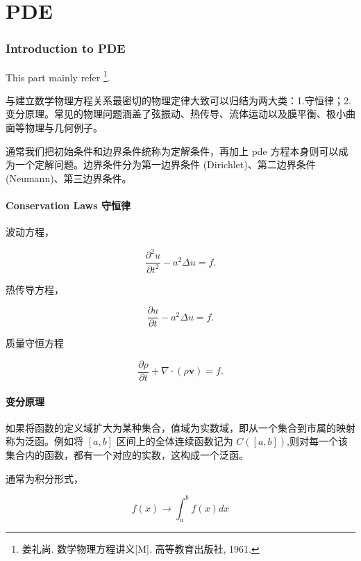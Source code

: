 \part{PDE}
\section{Introduction to PDE}

This part mainly refer \footnote{姜礼尚. 数学物理方程讲义[M]. 高等教育出版社, 1961.}.

与建立数学物理方程关系最密切的物理定律大致可以归结为两大类：1.守恒律；2.变分原理。常见的物理问题涵盖了弦振动、热传导、流体运动以及膜平衡、极小曲面等物理与几何例子。

通常我们把初始条件和边界条件统称为定解条件，再加上 pde 方程本身则可以成为一个定解问题。边界条件分为第一边界条件 (Dirichlet)、第二边界条件 (Neumann)、第三边界条件。

\subsection{Conservation Laws 守恒律}
波动方程，

\begin{equation}
\frac{\partial^2 u}{\partial t^2}-a^2\Delta u =f.
\end{equation}

热传导方程，

\begin{equation}
\frac{\partial u}{\partial t}-a^2\Delta u =f.
\end{equation}

质量守恒方程

\begin{equation}
\frac{\partial \rho}{\partial t}+\nabla\cdot (\rho \boldsymbol{v}) =f.
\end{equation}

\subsection{变分原理}

如果将函数的定义域扩大为某种集合，值域为实数域，即从一个集合到市属的映射称为泛函。例如将 $[a,b]$ 区间上的全体连续函数记为 $C([a,b])$,则对每一个该集合内的函数，都有一个对应的实数，这构成一个泛函。

通常为积分形式，

\begin{equation}
f(x) \rightarrow \int_a^b f(x)dx
\end{equation}

